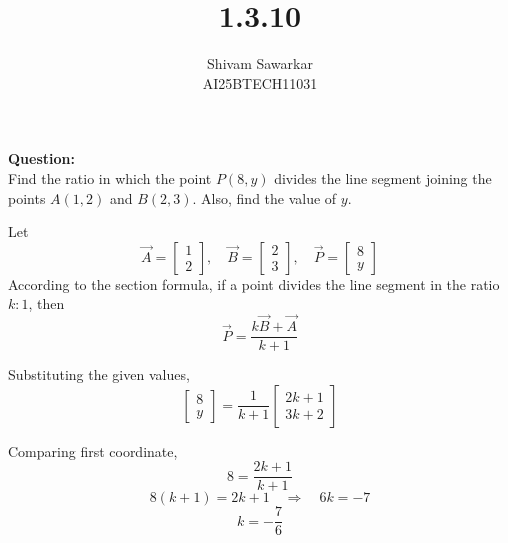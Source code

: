 \documentclass[journal]{IEEEtran}
\begin{document}

\vspace{3cm}

\title{1.3.10}
\author{Shivam Sawarkar \\ AI25BTECH11031}
 \maketitle
{\let\newpage\relax\maketitle}

\renewcommand{\thefigure}{\theenumi}
\renewcommand{\thetable}{\theenumi}
\setlength{\intextsep}{10pt} %


\renewcommand{\thetable}{\theenumi}


\textbf{Question:} \\
Find the ratio in which the point $P(8,y)$ divides the line segment joining the points 
$A(1,2)$ and $B(2,3)$. Also, find the value of $y$.



\solution
Let 
\[
\vec{A} = \begin{bmatrix}1\\2\end{bmatrix}, \quad
\vec{B} = \begin{bmatrix}2\\3\end{bmatrix}, \quad
\vec{P} = \begin{bmatrix}8\\y\end{bmatrix}
\]
According to the section formula, if a point divides the line segment in the ratio $k:1$, then
\begin{equation}
\vec{P} = \frac{k\vec{B} + \vec{A}}{k+1}
\end{equation}

Substituting the given values,
\begin{equation}
\begin{bmatrix}8\\y\end{bmatrix} = 
\frac{1}{k+1}
\begin{bmatrix}2k+1 \\ 3k+2\end{bmatrix}
\end{equation}

Comparing first coordinate,
\begin{equation}
8 = \frac{2k+1}{k+1}
\end{equation}
\begin{equation}
8(k+1) = 2k+1 \quad \Rightarrow \quad 6k = -7
\end{equation}
\begin{equation}
k = -\frac{7}{6}
\end{equation}
\end{document}
